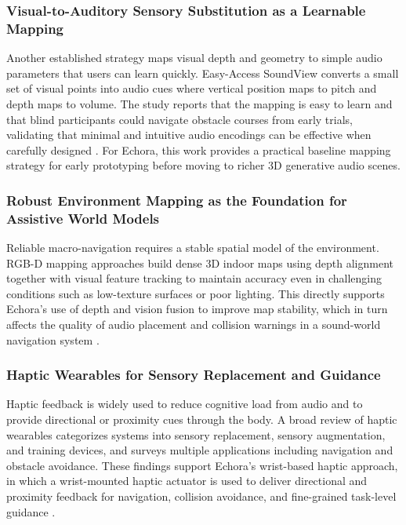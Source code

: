\subsubsection{Visual-to-Auditory Sensory Substitution as a Learnable Mapping}
\label{subsec:lit_visual_to_audio}

Another established strategy maps visual depth and geometry to simple audio parameters that users can learn quickly. Easy-Access SoundView converts a small set of visual points into audio cues where vertical position maps to pitch and depth maps to volume. The study reports that the mapping is easy to learn and that blind participants could navigate obstacle courses from early trials, validating that minimal and intuitive audio encodings can be effective when carefully designed \cite{soundview}. For Echora, this work provides a practical baseline mapping strategy for early prototyping before moving to richer 3D generative audio scenes.

\subsubsection{Robust Environment Mapping as the Foundation for Assistive World Models}
\label{subsec:lit_world_models}

Reliable macro-navigation requires a stable spatial model of the environment. RGB-D mapping approaches build dense 3D indoor maps using depth alignment together with visual feature tracking to maintain accuracy even in challenging conditions such as low-texture surfaces or poor lighting. This directly supports Echora’s use of depth and vision fusion to improve map stability, which in turn affects the quality of audio placement and collision warnings in a sound-world navigation system \cite{rgbd_mapping}.

\subsubsection{Haptic Wearables for Sensory Replacement and Guidance}
\label{subsec:lit_haptics}

Haptic feedback is widely used to reduce cognitive load from audio and to provide directional or proximity cues through the body. A broad review of haptic wearables categorizes systems into sensory replacement, sensory augmentation, and training devices, and surveys multiple applications including navigation and obstacle avoidance. These findings support Echora’s wrist-based haptic approach, in which a wrist-mounted haptic actuator is used to deliver directional and proximity feedback for navigation, collision avoidance, and fine-grained task-level guidance \cite{shull_damian2015}.

